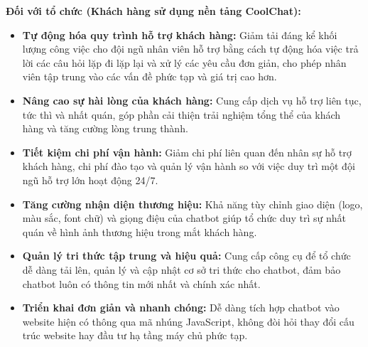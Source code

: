 \textbf{Đối với tổ chức (Khách hàng sử dụng nền tảng CoolChat):}
\begin{itemize}
    \item \textbf{Tự động hóa quy trình hỗ trợ khách hàng:} Giảm tải đáng kể khối lượng công việc cho đội ngũ nhân viên hỗ trợ bằng cách tự động hóa việc trả lời các câu hỏi lặp đi lặp lại và xử lý các yêu cầu đơn giản, cho phép nhân viên tập trung vào các vấn đề phức tạp và giá trị cao hơn.
    \item \textbf{Nâng cao sự hài lòng của khách hàng:} Cung cấp dịch vụ hỗ trợ liên tục, tức thì và nhất quán, góp phần cải thiện trải nghiệm tổng thể của khách hàng và tăng cường lòng trung thành.
    \item \textbf{Tiết kiệm chi phí vận hành:} Giảm chi phí liên quan đến nhân sự hỗ trợ khách hàng, chi phí đào tạo và quản lý vận hành so với việc duy trì một đội ngũ hỗ trợ lớn hoạt động 24/7.
    \item \textbf{Tăng cường nhận diện thương hiệu:} Khả năng tùy chỉnh giao diện (logo, màu sắc, font chữ) và giọng điệu của chatbot giúp tổ chức duy trì sự nhất quán về hình ảnh thương hiệu trong mắt khách hàng.
    \item \textbf{Quản lý tri thức tập trung và hiệu quả:} Cung cấp công cụ để tổ chức dễ dàng tải lên, quản lý và cập nhật cơ sở tri thức cho chatbot, đảm bảo chatbot luôn có thông tin mới nhất và chính xác nhất.
    \item \textbf{Triển khai đơn giản và nhanh chóng:} Dễ dàng tích hợp chatbot vào website hiện có thông qua mã nhúng JavaScript, không đòi hỏi thay đổi cấu trúc website hay đầu tư hạ tầng máy chủ phức tạp.
\end{itemize}

